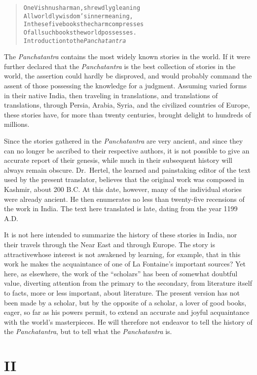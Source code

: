 \documentclass[article, twoside, 14pt]{memoir}
\renewenvironment{verbatim}{%
\begin{quote}%
\vskip -10pt%
\begin{alltt}\normalfont\large}{\end{alltt}%
\end{quote}%
\vskip -10pt
} %
\begin{document}
\begin{verbatim}
One Vishnusharman, shrewdly gleaning
All worldly wisdom's inner meaning,
In these five books the charm compresses
Of all such books the world possesses.
        {\textemdash}Introduction to the \emph{Panchatantra}
\end{verbatim}
The \emph{Panchatantra} contains the most widely known stories in
the world. If it were further declared that the \emph{Panchatantra}
is the best collection of stories in the world, the assertion could
hardly be disproved, and would probably command the assent of those
possessing the knowledge for a judgment. Assuming varied forms in
their native India, then traveling in translations, and
translations of translations, through Persia, Arabia, Syria, and
the civilized countries of Europe, these stories have, for more
than twenty centuries, brought delight to hundreds of millions.

Since the stories gathered in the \emph{Panchatantra} are very
ancient, and since they can no longer be ascribed to their
respective authors, it is not possible to give an accurate report
of their genesis, while much in their subsequent history will
always remain obscure. Dr.~Hertel, the learned and painstaking
editor of the text used by the present translator, believes that
the original work was composed in Kashmir, about 200 B.C. At this
date, however, many of the individual stories were already ancient.
He then enumerates no less than twenty-five recensions of the work
in India. The text here translated is late, dating from the year
1199 A.D.

It is not here intended to summarize the history of these stories
in India, nor their travels through the Near East and through
Europe. The story is attractive{\textemdash}whose interest is not awakened by
learning, for example, that in this work he makes the acquaintance
of one of La Fontaine's important sources? Yet here, as elsewhere,
the work of the ``scholars'' has been of somewhat doubtful value,
diverting attention from the primary to the secondary, from
literature itself to facts, more or less important, about
literature. The present version has not been made by a scholar, but
by the opposite of a scholar, a lover of good books, eager, so far
as his powers permit, to extend an accurate and joyful acquaintance
with the world's masterpieces. He will therefore not endeavor to
tell the history of the \emph{Panchatantra}, but to tell what the
\emph{Panchatantra} is.

\section{II}
\end{document}
